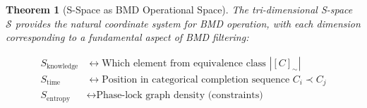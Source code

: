 \documentclass[12pt,a4paper]{article}
\newtheorem{theorem}{Theorem}[section]
\begin{document}
\begin{theorem}[S-Space as BMD Operational Space]
\label{thm:s_space_bmd}
The tri-dimensional S-space $\mathcal{S}$ provides the natural coordinate system for BMD operation, with each dimension corresponding to a fundamental aspect of BMD filtering:

\begin{align}
S_{\text{knowledge}} &\leftrightarrow \text{Which element from equivalence class } |[C]_{\sim}| \\
S_{\text{time}} &\leftrightarrow \text{Position in categorical completion sequence } C_i \prec C_j \\
S_{\text{entropy}} &\leftrightarrow \text{Phase-lock graph density (constraints)}
\end{align}
\end{theorem}
\end{document}
